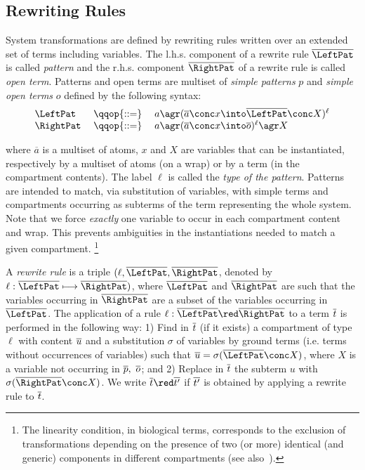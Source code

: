 \subsection{Rewriting Rules}
\label{CWC_formalism - rewriting}

System transformations are defined by rewriting rules written over an
extended set of terms including variables. The l.h.s. component  of a rewrite rule $\ov{\LeftPat}$ is called  \emph{pattern} and  the r.h.s. component $ \ov{\RightPat}$ of a rewrite rule is called \emph{open term}.  Patterns and open terms are multiset of \emph{simple patterns} $p$ and \emph{simple open terms} $o$ defined by the following syntax:
$$
\begin{array}{lcl}
\LeftPat  & \;\qqop{::=}\; & a \agr (\overline{a} \conc x \into \overline{\LeftPat}\conc X)^\ell \\
   \RightPat & \;\qqop{::=}\; & a \agr (\ov{a}  \conc x \into \ov{o})^\ell   \agr X
\end{array}
$$

where $\overline{a}$ is a multiset of atoms, $x$ and $X$ are
variables that can be instantiated, respectively by a multiset of atoms (on a wrap) or by a term (in the  compartment contents). The label $\ell$ is called the \emph{type of the pattern}. Patterns are intended to match, via substitution of variables, with simple terms and compartments occurring as subterms of the term representing the whole system. Note that we force \emph{exactly} one variable to occur in each
compartment content and wrap.
 This prevents ambiguities in the instantiations needed to match a given compartment.
 \footnote{
The linearity condition, in biological terms, corresponds to the exclusion of transformations depending on the presence of two (or more)
 identical (and generic) components in different compartments (see also~\cite{OP11}).}

A \emph{rewrite rule} is a triple $(\ell, \ov{\LeftPat},\ov{\RightPat} $, denoted by $\ell:  \overline{\LeftPat} \srew{}    \ov{\RightPat})$, where $\ov{\LeftPat}$ and $\ov{\RightPat}$ are such that the variables occurring in $\ov{\RightPat}$ are a subset of the variables occurring in $\ov{\LeftPat}$.
The application of a rule $\ell:  \ov{\LeftPat} \red \ov{\RightPat}$ to a term $\overline{t}$ is performed in the following way: 1) Find in $\overline{t}$ (if it
exists) a compartment of type $\ell$ with content $\overline{u}$ and a substitution $\sigma$ of variables by ground terms (i.e. terms without occurrences of variables) such that $\ov{u} = \sigma( \ov{\LeftPat} \conc
X)$, where $X$ is a variable not occurring in $\overline{p},~ \overline{o}$; and 2) Replace in $\overline{t}$ the
subterm $u$ with $\sigma(\ov{\RightPat}\conc X)$. We write  $\ov{t} \red \ov{t'}$ if $\overline{t'}$ is obtained  by applying a rewrite rule to  $\overline{t}$.


